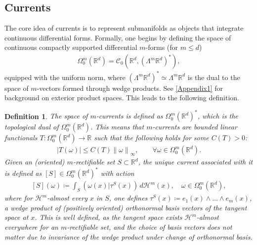 \documentclass[sn-mathphys-num]{sn-jnl}%
\theoremstyle{thmstyleone}%
\theoremstyle{thmstyletwo}%
\theoremstyle{thmstylethree}%
\newtheorem{definition}{Definition}%
\numberwithin{remark}{section}
\numberwithin{definition}{section}
\numberwithin{equation}{section}
\numberwithin{theorem}{section}
\newcommand{\norm}[1]{\left\lVert#1\right\rVert}
\newcommand{\R}{\ensuremath{\mathbb{R}}}%
\begin{document}
\subsection{Currents}
The core idea of currents is to represent submanifolds as objects that integrate continuous differential forms. Formally, one begins by defining the space of continuous compactly supported differential $m$-forms (for $m\leq d$)
\begin{align*}
    \Omega_{0}^{m}(\R^{d}) = \mathcal{C}_{0}(\R^{d},(\Lambda^{m}\R^{d})^{*}),
\end{align*}
equipped with the uniform norm, where $(\Lambda^{m}\R^{d})^{*}\simeq \Lambda^{m}\R^{d}$ is the dual to the space of $m$-vectors formed through wedge products. See \cref{Appendix1} for background on exterior product spaces. This leads to the following definition.
\begin{definition}
The space of $m$-currents is defined as $\Omega_{0}^{m}(\R^{d})^{*}$, which is the topological dual of $ \Omega_{0}^{m}(\R^{d})$. This means that $m$-currents are bounded linear functionals $T\colon \Omega_{0}^{m}(\R^{d}) \to \R $ such that the following holds for some $C(T)>0$:
\begin{align*}
    \lvert T(\omega)\rvert \leq C(T)\norm{\omega}_{\infty},\qquad \forall \omega \in  \Omega_{0}^{m}(\R^{d}).
\end{align*}
Given an (oriented) $m$-rectifiable set $S\subset \R^{d}$, the unique current associated with it is defined as $[S]\in  \Omega_{0}^{m}(\R^{d})^{*} $ with action
\begin{align}\label{currdef}
    [S](\omega) \coloneq \int_{S}{ (\omega(x)|\tau^{S}(x) ) \,d\mathcal{H}^{m}(x)},\quad \omega \in \Omega_{0}^{m}(\R^{d}),
\end{align}
where for $\mathcal{H}^{m}$-almost every $x$ in $S$, one defines $\tau^{S}(x) \coloneq e_{1}(x)\wedge \dots \wedge e_{m}(x)$, a wedge product of (positively oriented) orthonormal basis vectors of the tangent space at $x$. This is well defined, as the tangent space exists $\mathcal{H}^{m}$-almost everywhere for an $m$-rectifiable set, and the choice of basis vectors does not matter due to invariance of the wedge product under change of orthonormal basis. 
\end{definition}
\end{document}
